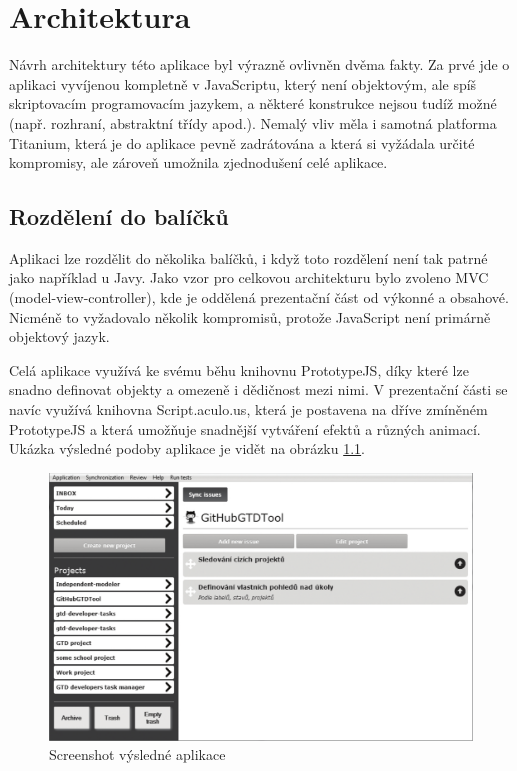 \chapter{Architektura}

Návrh architektury této aplikace byl výrazně ovlivněn dvěma fakty. Za prvé jde o aplikaci vyvíjenou kompletně v JavaScriptu, který není objektovým, ale spíš skriptovacím programovacím jazykem, a některé konstrukce nejsou tudíž možné (např. rozhraní, abstraktní třídy apod.). Nemalý vliv měla i samotná platforma Titanium, která je do aplikace pevně zadrátována a která si vyžádala určité kompromisy, ale zároveň umožnila zjednodušení celé aplikace.

\section{Rozdělení do balíčků}

Aplikaci lze rozdělit do několika balíčků, i když toto rozdělení není tak patrné jako například u Javy. Jako vzor pro celkovou architekturu bylo zvoleno MVC (model-view-controller), kde je oddělená prezentační část od výkonné a obsahové. Nicméně to vyžadovalo několik kompromisů, protože JavaScript není primárně objektový jazyk.

Celá aplikace využívá ke svému běhu knihovnu PrototypeJS\cite{prototypejs}, díky které lze snadno definovat objekty a omezeně i dědičnost mezi nimi. V prezentační části se navíc využívá knihovna Script.aculo.us\cite{scriptaculous}, která je postavena na dříve zmíněném PrototypeJS a která umožňuje snadnější vytváření efektů a různých animací. Ukázka výsledné podoby aplikace je vidět na obrázku \ref{fig:screenshot}.

\begin{figure}[h]
\begin{center}
	\includegraphics[width=14cm]{figures/screenshot}
	\caption{Screenshot výsledné aplikace}
	\label{fig:screenshot}
\end{center}
\end{figure}

